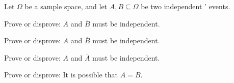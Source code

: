 \documentclass[11pt]{article}
\begin{document}

Let $\Omega$ be a sample space, and let $A,B \subseteq \Omega$ be two independent '
events.

\begin{Parts}

\Part Prove or disprove: $\overline{A}$ and $\overline{B}$ must be independent.

\Part Prove or disprove: $A$ and $\overline{B}$ must be independent.

\Part Prove or disprove: $A$ and $\overline{A}$ must be independent.

\Part Prove or disprove: It is possible that $A=B$.

\end{Parts}
\end{document}
